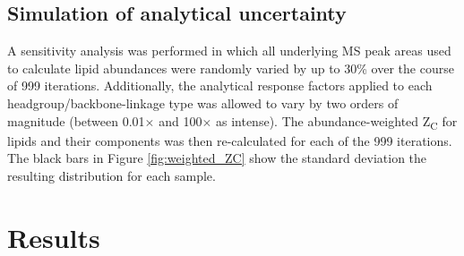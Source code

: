 \subsection{Simulation of analytical uncertainty} A sensitivity analysis was performed in which all underlying MS peak areas used to calculate lipid abundances were randomly varied by up to 30\% over the course of 999 iterations. Additionally, the analytical response factors applied to each headgroup/backbone-linkage type was allowed to vary by two orders of magnitude (between 0.01$\times$ and 100$\times$ as intense). The abundance-weighted Z\textsubscript{C} for lipids and their components was then re-calculated for each of the 999 iterations. The black bars in Figure \ref{fig:weighted_ZC} show the standard deviation the resulting distribution for each sample.

\section{Results}

